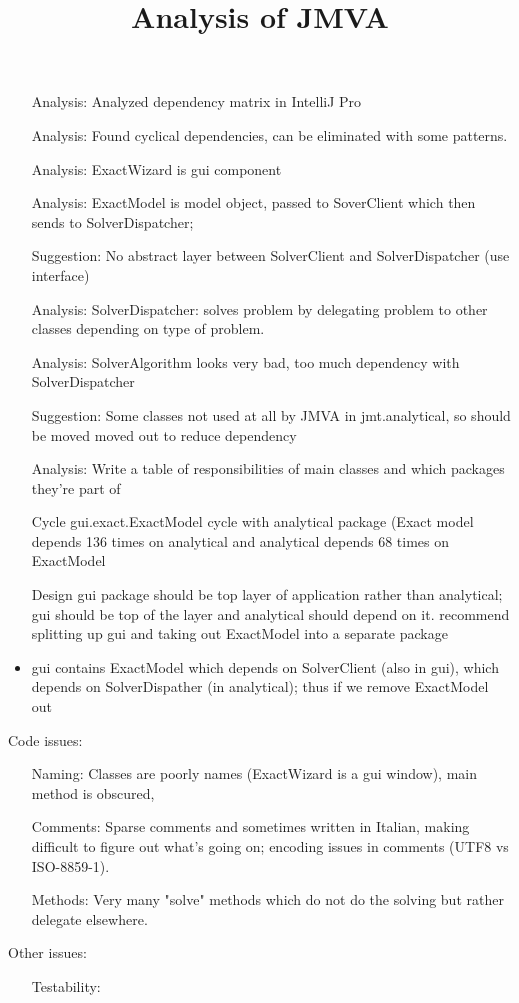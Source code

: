 \documentclass[11pt]{amsart}
\title{Analysis of JMVA}
\begin{document}
\maketitle
\begin{itemize}
\item[Analysis:] Analyzed dependency matrix in IntelliJ Pro
\item[Analysis:] Found cyclical dependencies, can be eliminated with some patterns.
\item[Analysis:] ExactWizard is gui component
\item[Analysis:] ExactModel is model object, passed to SoverClient which then sends to SolverDispatcher;
\item[Suggestion:] No abstract layer between SolverClient and SolverDispatcher (use interface)
\item[Analysis:] SolverDispatcher: solves problem by delegating problem to other classes depending on type of problem.
\item[Analysis:] SolverAlgorithm looks very bad, too much dependency with SolverDispatcher
\item[Suggestion:] Some classes not used at all by JMVA in jmt.analytical, so should be moved moved out to reduce dependency
\item[Analysis:] Write a table of responsibilities of main classes and which packages they're part of
\item[Cycle] gui.exact.ExactModel cycle with analytical package (Exact model depends 136 times on analytical and analytical depends 68 times on ExactModel
\item[Design] gui package should be top layer of application rather than analytical; gui should be top of the layer and analytical should depend on it.  recommend splitting up gui and taking out ExactModel into a separate package
\item gui contains ExactModel which depends on SolverClient (also in gui), which depends on SolverDispather (in analytical); thus if we remove ExactModel out
\end{itemize}

Code issues:
\begin{itemize}
\item[Naming:] Classes are poorly names (ExactWizard is a gui window), main method is obscured, 
\item[Comments:] Sparse comments and sometimes written in Italian, making difficult to figure out what's going on; encoding issues in comments (UTF8 vs ISO-8859-1).
\item[Methods:] Very many "solve" methods which do not do the solving but rather delegate elsewhere.
\end{itemize}

Other issues:
\begin{itemize}
\item[Testability:] 
\end{itemize}
\end{document}
